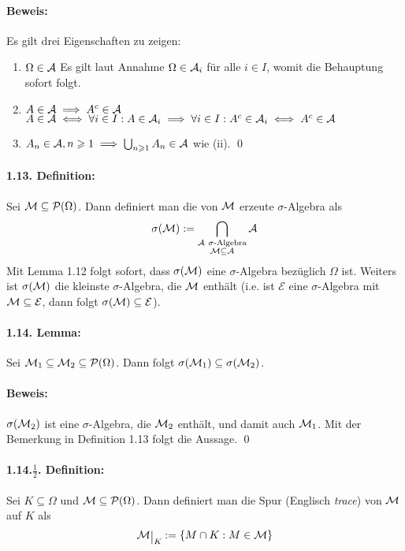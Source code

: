 \paragraph{Beweis:}Es gilt drei Eigenschaften zu zeigen:
\begin{enumerate}[label=(\roman*)]
    \item $\Omega\in\mathcal{A}$\newline
    Es gilt laut Annahme $\Omega\in\mathcal{A}_i$ f\"ur alle $i\in I$, womit die Behauptung sofort folgt.
    \item $A\in\mathcal{A}\implies A^c\in\mathcal{A}$\newline
    $A\in\mathcal{A}\iff\forall i\in I:A\in\mathcal{A}_i\implies\forall i\in I:A^c\in\mathcal{A}_i\iff A^c\in\mathcal{A}$
    \item $A_n\in\mathcal{A},n\geqslant1\implies\bigcup_{n\geqslant1}A_n\in\mathcal{A}$\newline
    wie (ii). \qed
\end{enumerate}

\paragraph{1.13. Definition:} Sei $\mathcal{M}\subseteq\mathcal{P}(\Omega)$. Dann definiert man die von $\mathcal{M}$ erzeute $\sigma$-Algebra als
$$\sigma(\M):=\bigcap_{\substack{\A\ \sigma\text{-Algebra}\\\M\subseteq\A}}\A$$
Mit Lemma 1.12 folgt sofort, dass $\sigma(\mathcal{M})$ eine $\sigma$-Algebra bez\"uglich $\Omega$ ist. Weiters ist $\sigma(\mathcal{M})$ die kleinste $\sigma$-Algebra, die $\mathcal{M}$ enth\"alt (i.e. ist $\mathcal{E}$ eine $\sigma$-Algebra mit $\mathcal{M}\subseteq\mathcal{E}$, dann folgt $\sigma(\mathcal{M})\subseteq\mathcal{E}$). 

\paragraph{1.14. Lemma:}Sei $\mathcal{M}_1\subseteq\mathcal{M}_2\subseteq\mathcal{P}(\Omega)$. Dann folgt $\sigma(\mathcal{M}_1)\subseteq\sigma(\mathcal{M}_2)$.

\paragraph{Beweis:}$\sigma(\mathcal{M}_2)$ ist eine $\sigma$-Algebra, die $\mathcal{M}_2$ enth\"alt, und damit auch $\mathcal{M}_1$. Mit der Bemerkung in Definition 1.13 folgt die Aussage. \qed

\paragraph{1.14.$\frac{1}{2}$. Definition:}Sei $K\subseteq\Omega$ und $\mathcal{M}\subseteq\mathcal{P}(\Omega)$. Dann definiert man die Spur (Englisch \textit{trace}) von $\mathcal{M}$ auf $K$ als
$$\M\krestr{K}:=\{M\cap K:M\in\M\}$$

